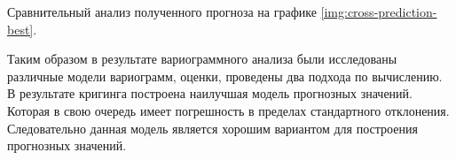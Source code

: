 Сравнительный анализ полученного прогноза на графике \ref{img:cross-prediction-best}.

Таким образом в результате вариограммного анализа были исследованы различные модели вариограмм, оценки, проведены два подхода по вычислению. В результате кригинга построена наилучшая модель прогнозных значений. Которая в свою очередь имеет погрешность в пределах стандартного отклонения. Следовательно данная модель является хорошим вариантом для построения прогнозных значений.
